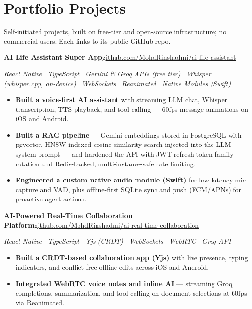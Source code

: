 \documentclass[a4paper,10pt]{article}
\newcommand{\project}[3]{%
  \vspace{2pt}\noindent\textbf{#1}\hfill{\small\color{black!70}#3}\par
  {\small\itshape\color{black!70}#2}\par\vspace{1pt}%
}
\begin{document}
\section{Portfolio Projects}
Self-initiated projects, built on free-tier and open-source infrastructure; no commercial users. Each links to its public GitHub repo.

\project{AI Life Assistant Super App}{React Native \textbullet\ TypeScript \textbullet\ Gemini \& Groq APIs (free tier) \textbullet\ Whisper (whisper.cpp, on-device) \textbullet\ WebSockets \textbullet\ Reanimated \textbullet\ Native Modules (Swift)}{\href{https://github.com/MohdRinshadmi/ai-life-assistant}{github.com/MohdRinshadmi/ai-life-assistant}}
\begin{itemize}
  \item \textbf{Built a voice-first AI assistant} with streaming LLM chat, Whisper transcription, TTS playback, and tool calling --- 60fps message animations on iOS and Android.
  \item \textbf{Built a RAG pipeline} --- Gemini embeddings stored in PostgreSQL with pgvector, HNSW-indexed cosine similarity search injected into the LLM system prompt --- and hardened the API with JWT refresh-token family rotation and Redis-backed, multi-instance-safe rate limiting.
  \item \textbf{Engineered a custom native audio module (Swift)} for low-latency mic capture and VAD, plus offline-first SQLite sync and push (FCM/APNs) for proactive agent actions.
\end{itemize}

\project{AI-Powered Real-Time Collaboration Platform}{React Native \textbullet\ TypeScript \textbullet\ Yjs (CRDT) \textbullet\ WebSockets \textbullet\ WebRTC \textbullet\ Groq API}{\href{https://github.com/MohdRinshadmi/ai-real-time-collaboration}{github.com/MohdRinshadmi/ai-real-time-collaboration}}
\begin{itemize}
  \item \textbf{Built a CRDT-based collaboration app (Yjs)} with live presence, typing indicators, and conflict-free offline edits across iOS and Android.
  \item \textbf{Integrated WebRTC voice notes and inline AI} --- streaming Groq completions, summarization, and tool calling on document selections at 60fps via Reanimated.
\end{itemize}

\end{document}
